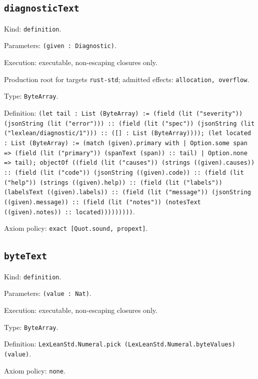 \documentclass[11pt]{article}
\begin{document}
\subsection*{\texttt{diagnosticText}}
\noindent Kind: \texttt{definition}.\par
\noindent Parameters: \texttt{(given : Diagnostic)}.\par
\noindent Execution: executable, non-escaping closures only.\par
\noindent Production root for targets \texttt{rust-std}; admitted effects: \texttt{allocation, overflow}.\par
\noindent Type: \texttt{ByteArray}.\par
\noindent Definition: \texttt{(let tail : List (ByteArray) := (field (lit ("severity")) (jsonString (lit ("error"))) :: (field (lit ("spec")) (jsonString (lit ("lexlean/diagnostic/1"))) :: ([] : List (ByteArray)))); (let located : List (ByteArray) := (match (given).primary with | Option.some span => (field (lit ("primary")) (spanText (span)) :: tail) | Option.none => tail); objectOf ((field (lit ("causes")) (strings ((given).causes)) :: (field (lit ("code")) (jsonString ((given).code)) :: (field (lit ("help")) (strings ((given).help)) :: (field (lit ("labels")) (labelsText ((given).labels)) :: (field (lit ("message")) (jsonString ((given).message)) :: (field (lit ("notes")) (notesText ((given).notes)) :: located)))))))))}.\par
\noindent Axiom policy: \texttt{exact [Quot.sound, propext]}.\par
\subsection*{\texttt{byteText}}
\noindent Kind: \texttt{definition}.\par
\noindent Parameters: \texttt{(value : Nat)}.\par
\noindent Execution: executable, non-escaping closures only.\par
\noindent Type: \texttt{ByteArray}.\par
\noindent Definition: \texttt{LexLeanStd.Numeral.pick (LexLeanStd.Numeral.byteValues) (value)}.\par
\noindent Axiom policy: \texttt{none}.\par
\end{document}
